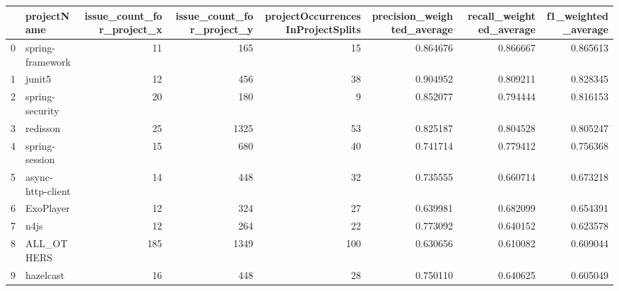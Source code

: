\begin{tabular}{llrrrrrr}
\toprule
{} &        projectName &  issue\_count\_for\_project\_x &  issue\_count\_for\_project\_y &  projectOccurrencesInProjectSplits &  precision\_weighted\_average &  recall\_weighted\_average &  f1\_weighted\_average \\
\midrule
0  &   spring-framework &                         11 &                        165 &                                 15 &                    0.864676 &                 0.866667 &             0.865613 \\
1  &             junit5 &                         12 &                        456 &                                 38 &                    0.904952 &                 0.809211 &             0.828345 \\
2  &    spring-security &                         20 &                        180 &                                  9 &                    0.852077 &                 0.794444 &             0.816153 \\
3  &           redisson &                         25 &                       1325 &                                 53 &                    0.825187 &                 0.804528 &             0.805247 \\
4  &     spring-session &                         15 &                        680 &                                 40 &                    0.741714 &                 0.779412 &             0.756368 \\
5  &  async-http-client &                         14 &                        448 &                                 32 &                    0.735555 &                 0.660714 &             0.673218 \\
6  &          ExoPlayer &                         12 &                        324 &                                 27 &                    0.639981 &                 0.682099 &             0.654391 \\
7  &               n4js &                         12 &                        264 &                                 22 &                    0.773092 &                 0.640152 &             0.623578 \\
8  &         ALL\_OTHERS &                        185 &                       1349 &                                100 &                    0.630656 &                 0.610082 &             0.609044 \\
9  &          hazelcast &                         16 &                        448 &                                 28 &                    0.750110 &                 0.640625 &             0.605049 \\

\end{tabular}

